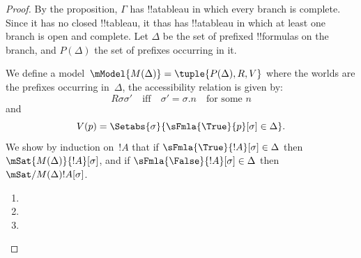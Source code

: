 \documentclass[../../../include/open-logic-section]{subfiles}
\begin{document}
\begin{proof}
By the proposition, $\Gamma$ has !!a{tableau} in which every branch is
complete. Since it has no closed !!{tableau}, it thas has !!a{tableau} in
which at least one branch is open and complete. Let $\Delta$ be the
set of prefixed !!{formula}s on the branch, and $P(\Delta)$ the set of
prefixes occurring in it.

We define a model~$\mModel{M(\Delta)} = \tuple{P(\Delta), R, V}$ where
the worlds are the prefixes occurring in~$\Delta$, the accessibility
relation is given by:
\[
R\sigma\sigma' \quad \text{iff} \quad
\sigma'=\sigma.n \quad \text{for some~$n$}
\]
and
\[
V(p) = \Setabs{\sigma}{\sFmla{\True}{p}[\sigma] \in \Delta}.
\]
We show by induction on~$!A$ that if $\sFmla{\True}{!A}[\sigma] \in
\Delta$ then $\mSat{M(\Delta)}{!A}[\sigma]$, and if
$\sFmla{\False}{!A}[\sigma] \in \Delta$ then
$\mSat/{M(\Delta)}{!A}[\sigma]$.

\begin{enumerate}
  \item {}
  \item {}
  \item {}
\end{enumerate}
\end{proof}
\end{document}
